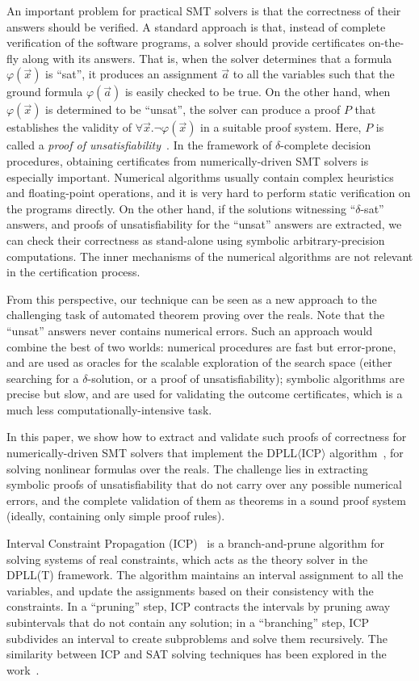 \documentclass[envcountsect]{llncs}
\begin{document}
An important problem
for practical SMT solvers is that the correctness
of their answers should be verified. A standard approach is that, instead of
complete verification of the software programs, a solver should provide
certificates on-the-fly along with its answers. That is, when the solver
determines that a formula $\varphi(\vec x)$ is ``sat'', it produces an
assignment $\vec a$ to all the
variables such that the ground formula $\varphi(\vec a)$ is easily checked to be
true. On the other hand, when $\varphi(\vec x)$ is determined to be ``unsat'',
the solver can produce a proof $P$ that establishes the validity of $\forall
\vec x.\neg\varphi(\vec x)$ in a suitable proof system. Here, $P$ is called a
{\em proof of unsatisfiability}~\cite{}. In the framework of $\delta$-complete
decision procedures, obtaining certificates from numerically-driven SMT solvers
is especially important. Numerical algorithms usually contain complex heuristics
and floating-point operations, and it is very hard to perform static
verification on the programs directly. On the other hand, if the solutions
witnessing ``$\delta$-sat'' answers, and proofs of unsatisfiability for the
``unsat'' answers are extracted,
we can check their correctness as stand-alone using symbolic
arbitrary-precision computations. The inner mechanisms of the numerical
algorithms are not relevant in the certification process. 

From this perspective, our technique can be seen as a new approach to the challenging
task of automated theorem proving over the reals. Note that the ``unsat''
answers never contains numerical errors. Such an approach
 would combine the best of two worlds: numerical procedures are
fast but error-prone, and are used as oracles for the scalable exploration of
the search space (either searching for a $\delta$-solution, or a proof of
unsatisfiability); symbolic algorithms are precise but slow, and are used for
validating the outcome certificates, which is a much less
computationally-intensive task. 

In this paper, we show how to extract and validate such proofs
of correctness for numerically-driven SMT solvers that implement the
DPLL$\langle$ICP$\rangle$ algorithm~\cite{}, for solving nonlinear formulas over
the reals. The challenge lies in extracting symbolic proofs of unsatisfiability
that do not carry over any possible numerical errors, and the complete
validation of them as theorems in a sound proof system (ideally, containing only
simple proof rules). 

Interval Constraint Propagation (ICP)~\cite{} is a branch-and-prune algorithm
for solving systems of real constraints, which acts as the theory solver in the
DPLL(T) framework. The algorithm maintains an interval
assignment to all the variables, and update the assignments based on their
consistency with the constraints. In a ``pruning''
step, ICP contracts the intervals by pruning away subintervals that do not
contain any solution; in a ``branching'' step, ICP subdivides an interval to
create subproblems and solve them recursively. The similarity between ICP and SAT solving techniques has
been explored in the work~\cite{}. 
\end{document}
